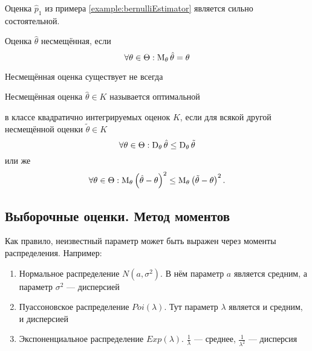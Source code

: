 \begin{example}
  Оценка $\hat{p}_1$ из примера \ref{example:bernulliEstimator}
  является сильно состоятельной.
\end{example}

\begin{definition}
  \label{def:estimatorBias}
  Оценка $\hat{\theta}$ несмещённая, если
  $$\forall\theta\in\Theta: \operatorname{M}_{\theta} \hat{\theta}=\theta$$
\end{definition}

\begin{remark}Несмещённая оценка существует не всегда
\end{remark}

\begin{definition}Несмещённая оценка $\hat{\theta}\in K$
называется оптимальной
\begin{comment}
\footnote{В учебнике Боровкова А. А.
``Математическая статистика'' оценка, удовлетворяющая этим условиям,
носит название \textbf{эффективная оценка} \cite[стр.~130]{BorovkovMS},
но у нас этот термин будет использоваться далее в другом смысле}
\end{comment}
в классе квадратично интегрируемых оценок $K$,
если для всякой другой несмещённой оценки $\tilde{\theta}\in K$
\begin{equation*}
  \forall\theta\in\Theta:
  \operatorname{D}_{\theta} \hat{\theta} \le \operatorname{D}_{\theta} \tilde{\theta}
\end{equation*}
или же
\begin{equation*}
  \forall\theta\in\Theta:
  \operatorname{M}_{\theta} \left(\hat{\theta} - \theta\right)^2
  \le \operatorname{M}_{\theta} \left( \tilde{\theta} - \theta \right)^2.
\end{equation*}
\end{definition}

\subsection{Выборочные оценки. Метод моментов}
Как правило, неизвестный параметр может быть выражен через моменты
распределения. Например:

\begin{enumerate}
  \item Нормальное распределение $N\left(a,\sigma^2\right)$.
    В нём параметр $a$ является средним,
    а параметр $\sigma^2$ --- дисперсией
  \item Пуассоновское распределение $Poi\left(\lambda\right)$.
    Тут параметр $\lambda$ является и средним, и дисперсией
  \item Экспоненциальное распределение $Exp\left(\lambda\right)$.
    $\frac{1}{\lambda}$ --- среднее,
    $\frac{1}{\lambda^2}$ --- дисперсия
\end{enumerate}

